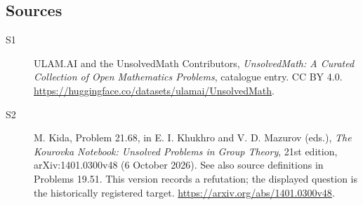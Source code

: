 \documentclass[11pt]{article}
\begin{document}
\subsection{Sources}
\begin{description}
\item[\hypertarget{source:statement:1}{S1}] ULAM.AI and the UnsolvedMath Contributors, \emph{UnsolvedMath: A Curated Collection of Open Mathematics Problems}, catalogue entry. CC BY 4.0. \url{https://huggingface.co/datasets/ulamai/UnsolvedMath}.
\item[\hypertarget{source:statement:2}{S2}] M. Kida, Problem 21.68, in E. I. Khukhro and V. D. Mazurov (eds.), \emph{The Kourovka Notebook: Unsolved Problems in Group Theory}, 21st edition, arXiv:1401.0300v48 (6 October 2026). See also source definitions in Problems 19.51. This version records a refutation; the displayed question is the historically registered target. \url{https://arxiv.org/abs/1401.0300v48}.
\end{description}
\label{end:statement}
\end{document}
